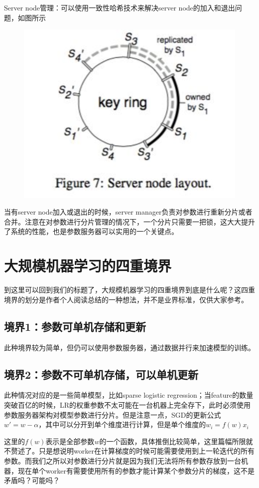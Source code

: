 \documentclass[12pt]{article}
\begin{document}
Server node管理：可以使用一致性哈希技术来解决server node的加入和退出问题，如图所示
\begin{figure}[H]
    \centering
    \includegraphics[width=.5\textwidth]{fig/Large_Scale_Server_Node_Layout.png}
\end{figure}
当有server node加入或退出的时候，server manager负责对参数进行重新分片或者合并。注意在对参数进行分片管理的情况下，一个分片只需要一把锁，这大大提升了系统的性能，也是参数服务器可以实用的一个关键点。

\section{大规模机器学习的四重境界}
到这里可以回到我们的标题了，大规模机器学习的四重境界到底是什么呢？这四重境界的划分是作者个人阅读总结的一种想法，并不是业界标准，仅供大家参考。

\subsection{境界1：参数可单机存储和更新}
此种境界较为简单，但仍可以使用参数服务器，通过数据并行来加速模型的训练。

\subsection{境界2：参数不可单机存储，可以单机更新}
此种情况对应的是一些简单模型，比如sparse logistic regression；当feature的数量突破百亿的时候，LR的权重参数不太可能在一台机器上完全存下，此时必须使用参数服务器架构对模型参数进行分片。但是注意一点，SGD的更新公式 $w' = w -\alpha$，其中可以分开到单个维度进行计算，但是单个维度的$w_i = f(w)x_i$

这里的$f(w)$表示是全部参数$w$的一个函数，具体推倒比较简单，这里篇幅所限就不赘述了。只是想说明worker在计算梯度的时候可能需要使用到上一轮迭代的所有参数。而我们之所以对参数进行分片就是因为我们无法将所有参数存放到一台机器，现在单个worker有需要使用所有的参数才能计算某个参数分片的梯度，这不是矛盾吗？可能吗？
\end{document}
